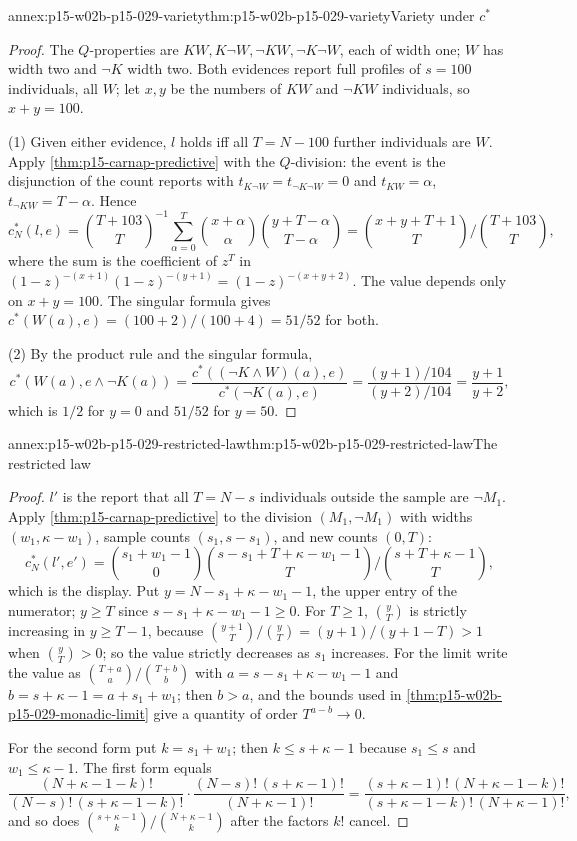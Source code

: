 \begin{annexitem}{annex:p15-w02b-p15-029-variety}{thm:p15-w02b-p15-029-variety}{Variety under \(c^*\)}
\begin{proof}
The \(Q\)-properties are \(KW,K\neg W,\neg KW,\neg K\neg W\), each of
width one; \(W\) has width two and \(\neg K\) width two. Both
evidences report full profiles of \(s=100\) individuals, all \(W\);
let \(x,y\) be the numbers of \(KW\) and \(\neg KW\) individuals, so
\(x+y=100\).

(1) Given either evidence, \(l\) holds iff all \(T=N-100\) further
individuals are \(W\). Apply \cref{thm:p15-carnap-predictive} with
the \(Q\)-division: the event is the disjunction of the count reports
with \(t_{K\neg W}=t_{\neg K\neg W}=0\) and
\(t_{KW}=\alpha\), \(t_{\neg KW}=T-\alpha\). Hence
\[
 c^*_N(l,e)=\binom{T+103}{T}^{-1}\sum_{\alpha=0}^T
 \binom{x+\alpha}{\alpha}\binom{y+T-\alpha}{T-\alpha}
 =\binom{x+y+T+1}{T}\Big/\binom{T+103}{T},
\]
where the sum is the coefficient of \(z^T\) in
\((1-z)^{-(x+1)}(1-z)^{-(y+1)}=(1-z)^{-(x+y+2)}\). The value depends
only on \(x+y=100\). The singular formula gives
\(c^*(W(a),e)=(100+2)/(100+4)=51/52\) for both.

(2) By the product rule and the singular formula,
\[
 c^*(W(a),e\land\neg K(a))
 =\frac{c^*((\neg K\land W)(a),e)}{c^*(\neg K(a),e)}
 =\frac{(y+1)/104}{(y+2)/104}=\frac{y+1}{y+2},
\]
which is \(1/2\) for \(y=0\) and \(51/52\) for \(y=50\).
\end{proof}
\end{annexitem}

\begin{annexitem}{annex:p15-w02b-p15-029-restricted-law}{thm:p15-w02b-p15-029-restricted-law}{The restricted law}
\begin{proof}
\(l'\) is the report that all \(T=N-s\) individuals outside the sample
are \(\neg M_1\). Apply \cref{thm:p15-carnap-predictive} to the
division \((M_1,\neg M_1)\) with widths \((w_1,\kappa-w_1)\),
sample counts \((s_1,s-s_1)\), and new counts \((0,T)\):
\[
 c^*_N(l',e')=\binom{s_1+w_1-1}{0}
 \binom{s-s_1+T+\kappa-w_1-1}{T}\Big/\binom{s+T+\kappa-1}{T},
\]
which is the display. Put \(y=N-s_1+\kappa-w_1-1\), the upper entry of
the numerator; \(y\geq T\) since \(s-s_1+\kappa-w_1-1\geq0\). For
\(T\geq1\), \(\binom yT\) is strictly increasing in \(y\geq T-1\),
because \(\binom{y+1}T/\binom yT=(y+1)/(y+1-T)>1\) when
\(\binom yT>0\); so the value strictly decreases as \(s_1\) increases.
For the limit write the value as \(\binom{T+a}a/\binom{T+b}b\) with
\(a=s-s_1+\kappa-w_1-1\) and \(b=s+\kappa-1=a+s_1+w_1\); then
\(b>a\), and the bounds used in
\cref{thm:p15-w02b-p15-029-monadic-limit} give a quantity of order
\(T^{a-b}\to0\).

For the second form put \(k=s_1+w_1\); then \(k\leq s+\kappa-1\)
because \(s_1\leq s\) and \(w_1\leq\kappa-1\). The first form equals
\[
 \frac{(N+\kappa-1-k)!}{(N-s)!\,(s+\kappa-1-k)!}\cdot
 \frac{(N-s)!\,(s+\kappa-1)!}{(N+\kappa-1)!}
 =\frac{(s+\kappa-1)!\,(N+\kappa-1-k)!}{(s+\kappa-1-k)!\,(N+\kappa-1)!},
\]
and so does
\(\binom{s+\kappa-1}k/\binom{N+\kappa-1}k\) after the factors
\(k!\) cancel.
\end{proof}
\end{annexitem}

